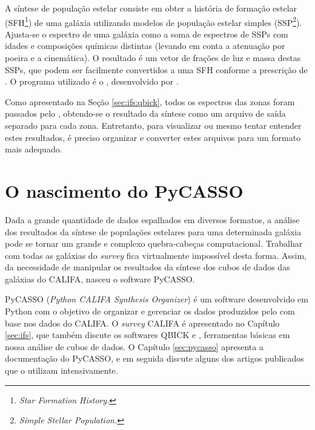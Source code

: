 
A síntese de população estelar consiste em obter a história de formação estelar
(SFH\footnote{\em Star Formation History.}) de uma galáxia utilizando modelos de
população estelar simples (SSP\footnote{\em Simple Stellar Population.}).
Ajusta-se o espectro de uma galáxia como a soma de espectros de SSPs com idades
e composições químicas distintas (levando em conta a atenuação por poeira e a
cinemática).
O resultado é um vetor de frações de luz e massa destas SSPs, que podem ser
facilmente convertidos a uma SFH conforme a prescrição de \cite{Asari2007}.
O programa utilizado é o \starlight, desenvolvido por \cite{CidFernandes2005}.

Como apresentado na Seção \ref{sec:ifs:qbick}, todos os espectros das zonas foram
passados pelo \starlight, obtendo-se o resultado da síntese como um arquivo de
saída separado para cada zona. Entretanto, para visualizar ou mesmo tentar
entender estes resultados, é preciso organizar e converter estes arquivos para
um formato mais adequado.




\section{O nascimento do PyCASSO}

Dada a grande quantidade de dados espalhados em diversos formatos, a análise dos
resultados da síntese de populações estelares para uma determinada galáxia pode
se tornar um grande e complexo quebra-cabeças computacional. Trabalhar com todas
as galáxias do {\em survey} fica virtualmente impossível desta forma. Assim, da
necessidade de manipular os resultados da síntese dos cubos de dados das
galáxias do CALIFA, nasceu o software PyCASSO.

PyCASSO ({\em Python CALIFA \starlight Synthesis Organizer}) é um software
desenvolvido em Python com o objetivo de organizar e gerenciar os dados
produzidos pelo \starlight com base nos dados do CALIFA. O {\em survey} CALIFA é
apresentado no Capítulo \ref{sec:ifs}, que também discute os softwares QBICK e
\starlight, ferramentas básicas em nossa análise de cubos de dados. O Capítulo
\ref{sec:pycasso} apresenta a documentação do PyCASSO, e em seguida discute
alguns dos artigos publicados que o utilizam intensivamente.


